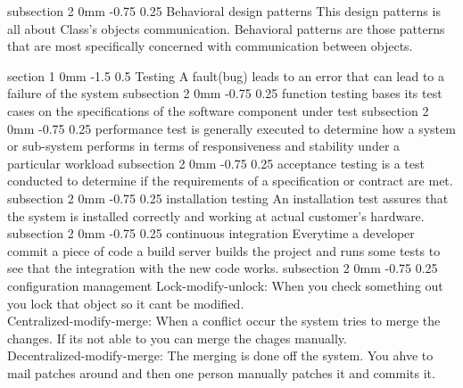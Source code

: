 \documentclass[a4paper,11pt]{article}
\makeatletter
\renewcommand{\section}{\@startsection
   {section}%
   {1}%
   {0mm}%
   {-1.5\baselineskip}%
   {0.5\baselineskip}%
   {\sffamily\bfseries\upshape\normalsize}}%
\renewcommand{\subsection}{\@startsection
   {subsection}%
   {2}%
   {0mm}%
   {-0.75\baselineskip}%
   {0.25\baselineskip}%
   {\rmfamily\normalfont\slshape\normalsize}}%
\makeatother
\begin{document}
\subsection{Behavioral design patterns}
This design patterns is all about Class's objects communication. Behavioral patterns are those patterns that are most specifically concerned with communication between objects.

\section{Testing}
A fault(bug) leads to an error that can lead to a failure of the system
\subsection{function testing}
bases its test cases on the specifications of the software component under test
\subsection{performance test}
is generally executed to determine how a system or sub-system performs in terms of responsiveness and stability under a particular workload
\subsection{acceptance testing}
 is a test conducted to determine if the requirements of a specification or contract are met. 
 \subsection{installation testing}
 An installation test assures that the system is installed correctly and working at actual customer's hardware.
\subsection{continuous integration}
Everytime a developer commit a piece of code a build server builds the project and runs some tests to see that the integration with the new code works.
\subsection{configuration management}
Lock-modify-unlock: When you check something out you lock that object so it cant be modified.
\\Centralized-modify-merge: When a conflict occur the system tries to merge the changes. If its not able to you can merge the chages manually.
\\Decentralized-modify-merge: The merging is done off the system. You ahve to mail patches around and then one person manually patches it and commits it. 
\end{document}
